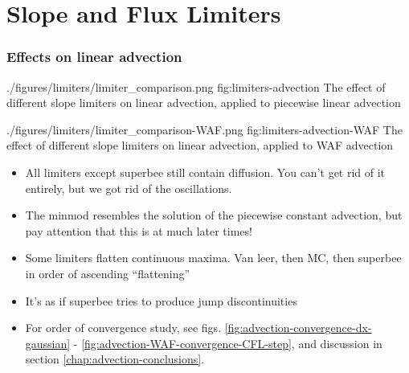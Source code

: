 \section{Slope and Flux Limiters}







\subsubsection{Effects on linear advection}


\quickfigcap
	{./figures/limiters/limiter_comparison.png}
	{fig:limiters-advection}
	{The effect of different slope limiters on linear advection, applied to piecewise linear advection}


\quickfigcap
	{./figures/limiters/limiter_comparison-WAF.png}
	{fig:limiters-advection-WAF}
	{The effect of different slope limiters on linear advection, applied to WAF advection}






\begin{itemize}

	\item All limiters except superbee still contain diffusion. You can't get rid of it entirely, but we got rid of the oscillations.
	
	\item The minmod resembles the solution of the piecewise constant advection, but pay attention that this is at much later times!
	
	\item Some limiters flatten continuous maxima. Van leer, then MC, then superbee in order of ascending ``flattening''
	
	\item It's as if superbee tries to produce jump discontinuities
	
	\item For order of convergence study, see figs. \ref{fig:advection-convergence-dx-gaussian} - \ref{fig:advection-WAF-convergence-CFL-step}, and discussion in section \ref{chap:advection-conclusions}.

\end{itemize}






